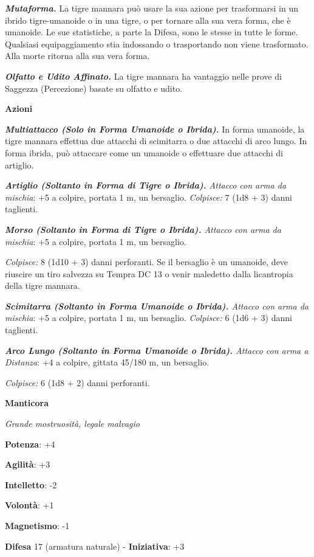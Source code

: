 \begin{multicols}{2}
\emph{\textbf{Mutaforma.}} La tigre mannara può usare la sua azione per
trasformarsi in un ibrido tigre-umanoide o in una tigre, o per tornare
alla sua vera forma, che è umanoide. Le sue statistiche, a parte la Difesa,
sono le stesse in tutte le forme. Qualsiasi equipaggiamento stia
indossando o trasportando non viene trasformato. Alla morte ritorna alla
sua vera forma.

\emph{\textbf{Olfatto e Udito Affinato.}} La tigre mannara ha vantaggio
nelle prove di Saggezza (Percezione) basate su olfatto e udito.

\smallskip\textbf{Azioni}

\emph{\textbf{Multiattacco (Solo in Forma Umanoide o Ibrida).}} In forma
umanoide, la tigre mannara effettua due attacchi di scimitarra o due
attacchi di arco lungo. In forma ibrida, può attaccare come un umanoide
o effettuare due attacchi di artiglio.

\emph{\textbf{Artiglio (Soltanto in Forma di Tigre o Ibrida).} Attacco
con arma da mischia}: +5 a colpire, portata 1 m, un bersaglio.
\emph{Colpisce:} 7 (1d8 + 3) danni taglienti.

\emph{\textbf{Morso (Soltanto in Forma di Tigre o Ibrida).} Attacco con
arma da mischia}: +5 a colpire, portata 1 m, un bersaglio.

\emph{Colpisce:} 8 (1d10 + 3) danni perforanti. Se il bersaglio è un
umanoide, deve riuscire un tiro salvezza su Tempra DC 13 o venir
maledetto dalla licantropia della tigre mannara.

\emph{\textbf{Scimitarra (Soltanto in Forma Umanoide o Ibrida).} Attacco
con arma da mischia}: +5 a colpire, portata 1 m, un bersaglio.
\emph{Colpisce:} 6 (1d6 + 3) danni taglienti.

\emph{\textbf{Arco Lungo (Soltanto in Forma Umanoide o Ibrida).} Attacco
con arma a Distanza}: +4 a colpire, gittata 45/180 m, un bersaglio.

\emph{Colpisce:} 6 (1d8 + 2) danni perforanti.

\textbf{Manticora}

\emph{Grande mostruosità, legale malvagio}

\textbf{Potenza}: +4

\textbf{Agilità}: +3

\textbf{Intelletto}: -2

\textbf{Volontà}: +1

\textbf{Magnetismo}: -1

\textbf{Difesa} 17 (armatura naturale) - \textbf{Iniziativa}: +3


\end{multicols}
